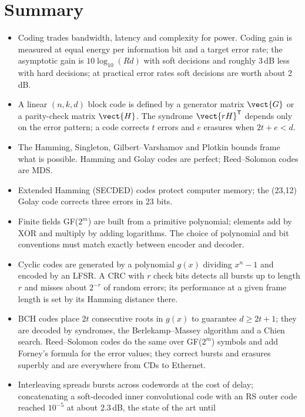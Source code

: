 \section{Summary}

\begin{itemize}
\item Coding trades bandwidth, latency and complexity for power. Coding gain is measured at equal
energy per information bit and a target error rate; the asymptotic gain is $10\log_{10}(Rd)$ with soft
decisions and roughly 3\,dB less with hard decisions; at practical error rates soft decisions are worth
about 2\,dB.
\item A linear $(n,k,d)$ block code is defined by a generator matrix $\vect{G}$ or a parity-check matrix
$\vect{H}$. The syndrome $\vect{rH}^{\mathsf T}$ depends only on the error pattern; a code corrects $t$
errors and $e$ erasures when $2t+e<d$.
\item The Hamming, Singleton, Gilbert--Varshamov and Plotkin bounds frame what is possible. Hamming and
Golay codes are perfect; Reed--Solomon codes are MDS.
\item Extended Hamming (SECDED) codes protect computer memory; the (23,12) Golay code corrects three errors
in 23 bits.
\item Finite fields GF($2^m$) are built from a primitive polynomial; elements add by XOR and multiply by
adding logarithms. The choice of polynomial and bit conventions must match exactly between encoder and
decoder.
\item Cyclic codes are generated by a polynomial $g(x)$ dividing $x^n-1$ and encoded by an LFSR. A CRC with
$r$ check bits detects all bursts up to length $r$ and misses about $2^{-r}$ of random errors; its
performance at a given frame length is set by its Hamming distance there.
\item BCH codes place $2t$ consecutive roots in $g(x)$ to guarantee $d\ge2t+1$; they are decoded by
syndromes, the Berlekamp--Massey algorithm and a Chien search. Reed--Solomon codes do the same over
GF($2^m$) symbols and add Forney's formula for the error values; they correct bursts and erasures
superbly and are everywhere from CDs to Ethernet.
\item Interleaving spreads bursts across codewords at the cost of delay; concatenating a soft-decoded inner
convolutional code with an RS outer code reached $10^{-5}$ at about 2.3\,dB, the state of the art until

\end{itemize}
